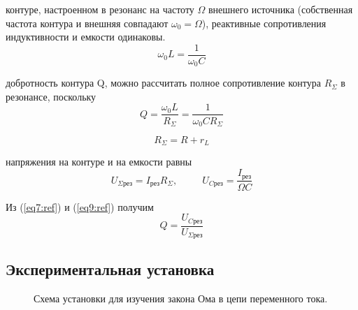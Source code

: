 \documentclass[a4paper,12pt]{article} %
\begin{document}
 контуре, настроенном в резонанс на частоту $\Omega$ внешнего источника (собственная частота контура и внешняя совпадают $\omega_0 = \Omega$), реактивные сопротивления индуктивности и емкости одинаковы.
\begin{equation}
\omega_0 L = \frac{1}{\omega_0 C}
\label{eq6:ref}
\end{equation}

 добротность контура Q, можно рассчитать полное сопротивление контура $R_\Sigma$ в резонансе, поскольку
\begin{equation}
Q = \frac{\omega_0 L}{R_\Sigma} = \frac{1}{\omega_0 C R_\Sigma}
\label{eq7:ref}
\end{equation}

\begin{equation}
R_\Sigma = R + r_L
\label{eq8:ref}
\end{equation}

 напряжения на контуре и на емкости равны
\begin{equation}
U_{\Sigma\text{рез}} = I_{\text{рез}}R_\Sigma,\;\;\;\;\;\;\;\;\;U_{C\text{рез}} = \frac{I_{\text{рез}}}{\Omega C}
\label{eq9:ref}
\end{equation}

Из (\ref{eq7:ref}) и (\ref{eq9:ref}) получим
\begin{equation}
Q = \frac{U_{C\text{рез}}}{U_{\Sigma\text{рез}}}
\label{eq10:ref}
\end{equation}

\subsection{Экспериментальная установка}

\begin{figure}[H]
\noindent{}
\caption{Схема установки для изучения закона Ома в цепи переменного тока.}
\label{pic2:ref}
\end{figure}
\end{document}
